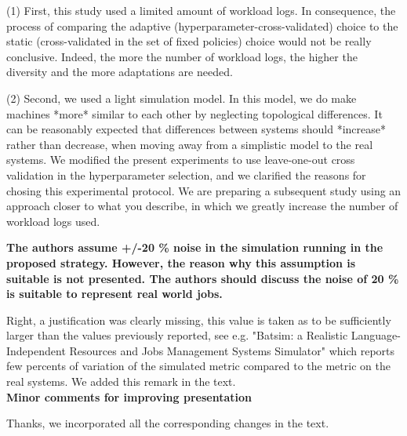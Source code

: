 \documentclass[]{article}
\begin{document}
(1) First, this study used a limited amount of workload logs. In consequence, the
process of comparing the adaptive (hyperparameter-cross-validated) choice to
the static (cross-validated in the set of fixed policies) choice would not be
really conclusive.  Indeed, the more the number of workload logs, the higher the
diversity and the more adaptations are needed.

(2) Second, we used a light simulation model. In this model, we do make
machines *more* similar to each other by neglecting topological differences. It
can be reasonably expected that differences between systems should *increase*
rather than decrease, when moving away from a simplistic model to the real
systems.
We modified the present experiments to use leave-one-out cross
validation in the hyperparameter selection, and we clarified the reasons for
chosing this experimental protocol.
We are preparing a subsequent study using an approach closer to what you
describe, in which we greatly increase the number of workload logs used.
\medskip

\textbf{The authors assume +/-20 \% noise in the simulation running in the
proposed strategy. However, the reason why this assumption is suitable is not
presented. The authors should discuss the noise of 20 \% is suitable to represent
real world jobs.}

Right, a justification was clearly missing, this value is taken as to be
sufficiently larger than the values previously reported, see e.g. "Batsim: a
Realistic Language-Independent Resources and Jobs Management Systems Simulator"
which reports few percents of variation of the simulated metric compared to the
metric on the real systems. We added this remark in the text.\\

\textbf{Minor comments for improving presentation}

Thanks, we incorporated all the corresponding changes in the text.



\end{document}
